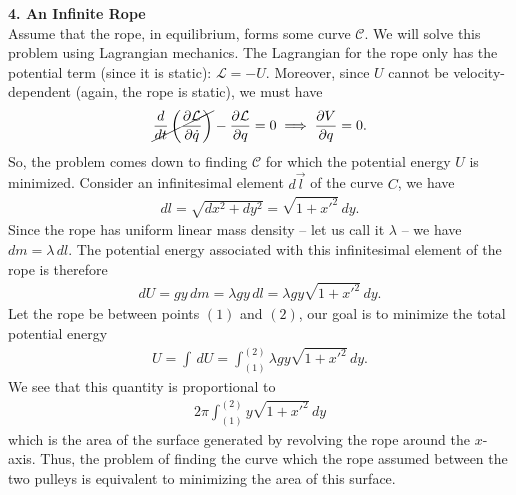 \documentclass{article}
\theoremstyle{definition}
\newcommand{\p}{\partial}
\newcommand{\lag}{\mathcal{L}}
\newcommand{\f}[2]{\frac{#1}{#2}}
\newcommand{\lp}{\left(}
\newcommand{\rp}{\right)}
\begin{document}
\noindent \textbf{4. An Infinite Rope} \\

\noindent Assume that the rope, in equilibrium, forms some curve $\mathcal{C}$. We will solve this problem using Lagrangian mechanics. The Lagrangian for the rope only has the potential term (since it is static): $\lag = -U$. Moreover, since $U$ cannot be velocity-dependent (again, the rope is static), we must have
\begin{align*}
\cancel{\f{d}{dt}\lp \f{\p \lag}{\p \dot{q}} \rp} - \f{\p \lag}{\p q} = 0\implies  \f{\p V}{\p q} = 0.
\end{align*}
So, the problem comes down to finding $\mathcal{C}$ for which the potential energy $U$ is minimized. Consider an infinitesimal element $d\vec{l}$ of the curve $C$, we have 
\begin{align*}
dl = \sqrt{dx^2 + dy^2} = \sqrt{1+x'^2}\,dy.
\end{align*} 
Since the rope has uniform linear mass density -- let us call it  $\lambda$ -- we have $dm = \lambda \,dl$. The potential energy associated with this infinitesimal element of the rope is therefore
\begin{align*}
dU = gy\,dm = \lambda gy\,dl = \lambda g y \sqrt{1+x'^2}\,dy.
\end{align*}
Let the rope be between points $(1)$ and $(2)$, our goal is to minimize the total potential energy
\begin{align*}
U = \int\,dU =  \int^{(2)}_{(1)} \lambda g y \sqrt{1+x'^2}\,dy.
\end{align*}
We see that this quantity is proportional to 
\begin{align*}
2\pi \int^{(2)}_{(1)} y \sqrt{1+x'^2}\,dy
\end{align*}
which is the area of the surface generated by revolving the rope around the $x$-axis. Thus,  the problem of finding the curve which the rope assumed between the two pulleys is equivalent to minimizing the area of this surface.  \\
\end{document}
